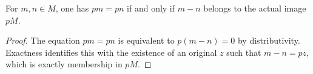 \begin{corollary}
\label{cor:witt-two-flat-division-uniqueness}
\leanok
{}
For $m,n\in M$, one has $pm=pn$ if and only if
$m-n$ belongs to the actual image $pM$.
\end{corollary}
\begin{proof}
The equation $pm=pn$ is equivalent to
$p(m-n)=0$ by distributivity. Exactness identifies
this with the existence of an original $z$ such
that $m-n=pz$, which is exactly membership in $pM$.
\end{proof}
